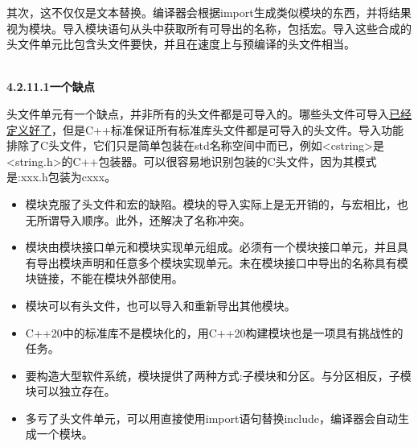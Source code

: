 其次，这不仅仅是文本替换。编译器会根据import生成类似模块的东西，并将结果视为模块。导入模块语句从头中获取所有可导出的名称，包括宏。导入这些合成的头文件单元比包含头文件要快，并且在速度上与预编译的头文件相当。

\hspace*{\fill} \\ %
\noindent
\textbf{4.2.11.1\hspace{0.2cm}一个缺点}

头文件单元有一个缺点，并非所有的头文件都是可导入的。哪些头文件可导入\href{https://en.cppreference.com/w/cpp/language/ub}{已经定义好了}，但是C++标准保证所有标准库头文件都是可导入的头文件。导入功能排除了C头文件，它们只是简单包装在std名称空间中而已，例如<cstring>是<string.h>的C++包装器。可以很容易地识别包装的C头文件，因为其模式是:xxx.h包装为cxxx。

\begin{tcolorbox}[colback=mygreen!5!white,colframe=mygreen!75!black,title={使用Microsoft编译器构建可执行文件}]

\begin{itemize}
\item 
模块克服了头文件和宏的缺陷。模块的导入实际上是无开销的，与宏相比，也无所谓导入顺序。此外，还解决了名称冲突。

\item 
模块由模块接口单元和模块实现单元组成。必须有一个模块接口单元，并且具有导出模块声明和任意多个模块实现单元。未在模块接口中导出的名称具有模块链接，不能在模块外部使用。

\item 
模块可以有头文件，也可以导入和重新导出其他模块。

\item 
C++20中的标准库不是模块化的，用C++20构建模块也是一项具有挑战性的任务。

\item 
要构造大型软件系统，模块提供了两种方式:子模块和分区。与分区相反，子模块可以独立存在。

\item 
多亏了头文件单元，可以用直接使用import语句替换include，编译器会自动生成一个模块。
\end{itemize}

\end{tcolorbox}












































